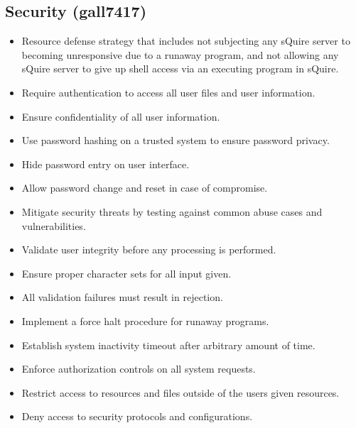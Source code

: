 \documentclass[11pt]{report}
\begin{document}
    \subsection{Security (gall7417)}
        \begin{itemize}
            \item Resource defense strategy that includes not subjecting any sQuire server to becoming unresponsive due to a runaway program, and not allowing any sQuire server to give up shell access via an executing program in sQuire.
            \item Require authentication to access all user files and user information.
            \item Ensure confidentiality of all user information.
            \item Use password hashing on a trusted system to ensure password privacy.
            \item Hide password entry on user interface.
            \item Allow password change and reset in case of compromise.
            \item Mitigate security threats by testing against common abuse cases and vulnerabilities.
            \item Validate user integrity before any processing is performed.
            \item Ensure proper character sets for all input given.
            \item All validation failures must result in rejection.
            \item Implement a force halt procedure for runaway programs.
            \item Establish system inactivity timeout after arbitrary amount of time.
            \item Enforce authorization controls on all system requests.
            \item Restrict access to resources and files outside of the users given resources.
            \item Deny access to security protocols and configurations.
        \end{itemize}
\end{document}
